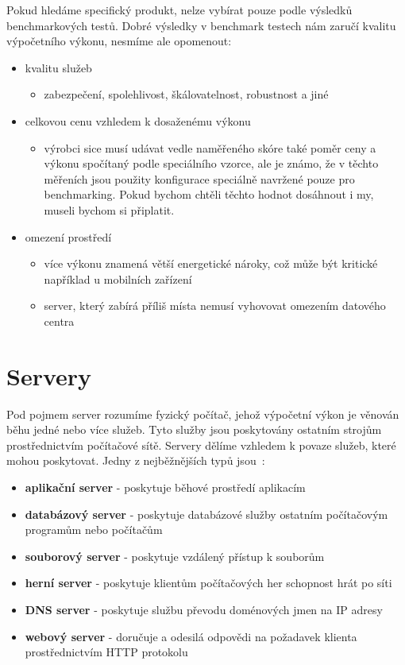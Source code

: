 \documentclass[122pt,oneside]{fithesis}
\begin{document}
Pokud hledáme specifický produkt, nelze vybírat pouze podle výsledků benchmarkových testů. Dobré výsledky v benchmark testech nám zaručí kvalitu výpočetního výkonu, nesmíme ale opomenout:

\begin{itemize}
  \item kvalitu služeb
  \begin{itemize}
    \item zabezpečení, spolehlivost, škálovatelnost, robustnost a jiné
  \end{itemize}
  \item celkovou cenu vzhledem k dosaženému výkonu 
  \begin{itemize}
    \item  výrobci sice musí udávat vedle naměřeného skóre také poměr ceny a výkonu spočítaný podle speciálního vzorce, ale je známo, že v těchto měřeních jsou použity konfigurace speciálně navržené pouze pro benchmarking. Pokud bychom chtěli těchto hodnot dosáhnout i my, museli bychom si připlatit.
  \end{itemize}
  \item omezení prostředí
  \begin{itemize}
    \item více výkonu znamená větší energetické nároky, což může být kritické například u mobilních zařízení
    \item server, který zabírá příliš místa nemusí vyhovovat omezením datového centra
  \end{itemize}
\end{itemize}

\section{Servery}

Pod pojmem server rozumíme fyzický počítač, jehož výpočetní výkon je věnován běhu jedné nebo více služeb. Tyto služby jsou poskytovány ostatním strojům prostřednictvím počítačové sítě. Servery dělíme vzhledem k povaze služeb, které mohou poskytovat. Jedny z nejběžnějších typů jsou~\cite{wikiServerComp}:
\begin{itemize}
  \item {\bf aplikační server} - poskytuje běhové prostředí aplikacím
  \item {\bf databázový server} - poskytuje databázové služby ostatním počítačovým programům nebo počítačům
  \item {\bf souborový server} - poskytuje vzdálený přístup k souborům
  \item {\bf herní server} - poskytuje klientům počítačových her schopnost hrát po síti
  \item {\bf DNS server} - poskytuje službu převodu doménových jmen na IP adresy
  \item {\bf webový server} - doručuje a odesilá odpovědi na požadavek klienta prostřednictvím HTTP protokolu
\end{itemize}
\end{document}

